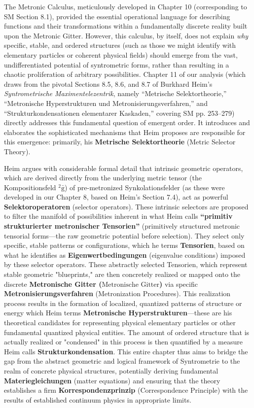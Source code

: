 \documentclass[12pt]{article}
\newcommand{\q}[1]{\enquote{#1}}
\newcommand{\kompositionsfeld}{{}^2\bar{\mathrm{g}}}
\newcommand{\metronischegitter}{\text{Metronische Gitter}}
\begin{document}
The Metronic Calculus, meticulously developed in Chapter 10 (corresponding to SM Section 8.1), provided the essential operational language for describing functions and their transformations within a fundamentally discrete reality built upon the Metronic Gitter. However, this calculus, by itself, does not explain \textit{why} specific, stable, and ordered structures (such as those we might identify with elementary particles or coherent physical fields) should emerge from the vast, undifferentiated potential of syntrometric forms, rather than resulting in a chaotic proliferation of arbitrary possibilities. Chapter 11 of our analysis (which draws from the pivotal Sections 8.5, 8.6, and 8.7 of Burkhard Heim's \textit{Syntrometrische Maximentelezentrik}, namely \q{Metrische Selektortheorie,} \q{Metronische Hyperstrukturen und Metronisierungsverfahren,} and \q{Strukturkondensationen elementarer Kaskaden,} covering SM pp. 253–279) directly addresses this fundamental question of emergent order. It introduces and elaborates the sophisticated mechanisms that Heim proposes are responsible for this emergence: primarily, his \textbf{Metrische Selektortheorie} (Metric Selector Theory).

Heim argues with considerable formal detail that intrinsic geometric operators, which are derived directly from the underlying metric tensor (the Kompositionsfeld \( \kompositionsfeld \)) of pre-metronized Synkolationsfelder (as these were developed in our Chapter 8, based on Heim's Section 7.4), act as powerful \textbf{Selektoroperatoren} (selector operators). These intrinsic selectors are proposed to filter the manifold of possibilities inherent in what Heim calls \textbf{\q{primitiv strukturierter metronischer Tensorien}} (primitively structured metronic tensorial forms—the raw geometric potential before selection). They select only specific, stable patterns or configurations, which he terms \textbf{Tensorien}, based on what he identifies as \textbf{Eigenwertbedingungen} (eigenvalue conditions) imposed by these selector operators. These abstractly selected Tensorien, which represent stable geometric "blueprints," are then concretely realized or mapped onto the discrete \textbf{Metronische Gitter (\(\metronischegitter\))} via specific \textbf{Metronisierungsverfahren} (Metronization Procedures). This realization process results in the formation of localized, quantized patterns of structure or energy which Heim terms \textbf{Metronische Hyperstrukturen}—these are his theoretical candidates for representing physical elementary particles or other fundamental quantized physical entities. The amount of ordered structure that is actually realized or "condensed" in this process is then quantified by a measure Heim calls \textbf{Strukturkondensation}. This entire chapter thus aims to bridge the gap from the abstract geometric and logical framework of Syntrometrie to the realm of concrete physical structures, potentially deriving fundamental \textbf{Materiegleichungen} (matter equations) and ensuring that the theory establishes a firm \textbf{Korrespondenzprinzip} (Correspondence Principle) with the results of established continuum physics in appropriate limits.
\end{document}

